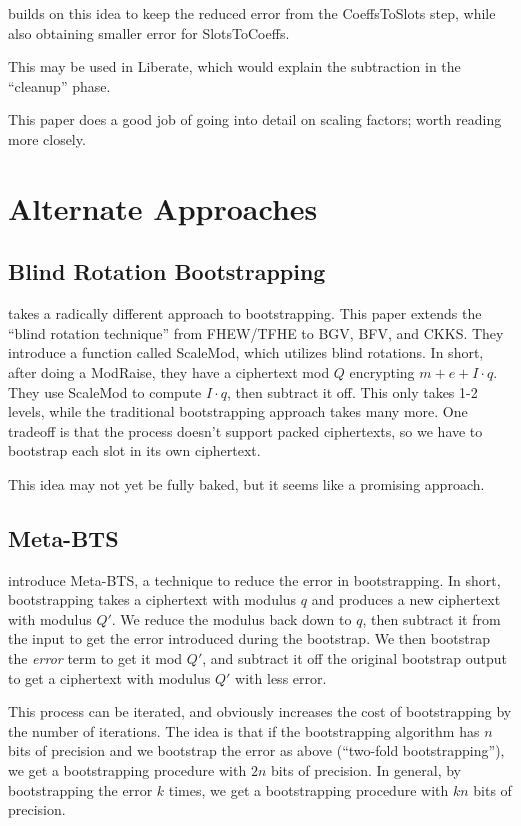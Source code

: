 \documentclass[../fheimpl.tex]{subfiles}
\begin{document}
    \cite{cryptoeprint:2024/1379} builds on this idea to keep the reduced error from the CoeffsToSlots step, while also obtaining smaller error for SlotsToCoeffs.
    
    This may be used in Liberate, which would explain the subtraction in the ``cleanup'' phase.
    
    This paper does a good job of going into detail on scaling factors; worth reading more closely.
    
    \section{Alternate Approaches}
    \subsection{Blind Rotation Bootstrapping}
    \cite{cryptoeprint:2021/691} takes a radically different approach to bootstrapping. This paper extends the ``blind rotation technique'' from FHEW/TFHE to BGV, BFV, and CKKS. They introduce a function called ScaleMod, which utilizes blind rotations. In short, after doing a ModRaise, they have a ciphertext mod $Q$ encrypting $m+e+I\cdot q$. They use ScaleMod to compute $I\cdot q$, then subtract it off. This only takes 1-2 levels, while the traditional bootstrapping approach takes many more. One tradeoff is that the process doesn't support packed ciphertexts, so we have to bootstrap each slot in its own ciphertext.
    
    This idea may not yet be fully baked, but it seems like a promising approach.
    
    \subsection{Meta-BTS}
    \cite{cryptoeprint:2022/1167} introduce Meta-BTS, a technique to reduce the error in bootstrapping. In short, bootstrapping takes a ciphertext with modulus $q$ and produces a new ciphertext with modulus $Q'$. We reduce the modulus back down to $q$, then subtract it from the input to get the error introduced during the bootstrap. We then bootstrap the \emph{error} term to get it mod $Q'$, and subtract it off the original bootstrap output to get a ciphertext with modulus $Q'$ with less error.
    
    This process can be iterated, and obviously increases the cost of bootstrapping by the number of iterations. The idea is that if the bootstrapping algorithm has $n$ bits of precision and we bootstrap the error as above (``two-fold bootstrapping''), we get a bootstrapping procedure with $2n$ bits of precision. In general, by bootstrapping the error $k$ times, we get a bootstrapping procedure with $kn$ bits of precision.
    
\end{document}
